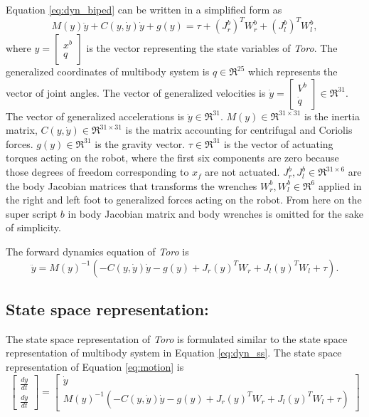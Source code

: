 Equation \ref{eq:dyn_biped} can be written in a simplified form as
\begin{equation} \label{eq:dyn_sbiped}
M(y)\ddot{y} + C(y,\dot{y})\dot{y} + g(y) = \tau + (J_r^b)^T W_r^b + (J_l^b)^T W_l^b,
\end{equation}
where $y = \begin{bmatrix} x^b \\ q \end{bmatrix}$ is the vector representing the state variables of \emph{Toro}. The generalized coordinates of multibody system is $q \in \Re^{25}$ which represents the vector of joint angles. The vector of generalized velocities is $\dot{y}=\begin{bmatrix} V^{b} \\ \dot{q} \end{bmatrix} \in \Re^{31}.$ The vector of generalized accelerations is $\ddot{y}\in \Re^{31}.$  $M(y)\in \Re^{31 \times 31}$ is the inertia matrix, $C(y,\dot{y})\in \Re^{31 \times 31}$ is the matrix accounting for centrifugal and Coriolis forces. $g(y) \in \Re^{31}$ is the gravity vector. $\tau \in \Re^{31}$ is the vector of actuating torques acting on the robot, where the first six components are zero because those degrees of freedom corresponding to $x_f$ are not actuated. $J_r^b,J_l^b \in \Re^{31 \times 6}$ are the body Jacobian matrices that transforms the wrenches $W_r^b,W_l^b \in \Re^{6}$ applied in the right and left foot to generalized forces acting on the robot. From here on the super script $b$ in body Jacobian matrix and body wrenches is omitted for the sake of simplicity.

The forward dynamics equation of \emph{Toro} is
\begin{equation}
	\label{eq:motion}
	\ddot{y} = M(y)^{-1}(-C(y,\dot{y})\dot{y} - g(y) + J_r(y)^{T}W_{r} +J_l(y)^{T}W_{l} + \tau). 
\end{equation}

\subsection{State space representation:}
The state space representation of \emph{Toro} is formulated similar to the state space representation of multibody system in Equation \ref{eq:dyn_ss}. The state space representation of Equation \ref{eq:motion} is
\begin{equation}
\label{eq:newton_motion}
 \begin{bmatrix}
\frac{dy}{dt} \\ \frac{d\dot y}{dt}
\end{bmatrix}
= \begin{bmatrix}
\dot y \\  M(y)^{-1}(-C(y,\dot{y})\dot{y} - g(y) + J_r(y)^{T}W_{r} +J_l(y)^{T}W_{l} + \tau) 
\end{bmatrix}
\end{equation}

